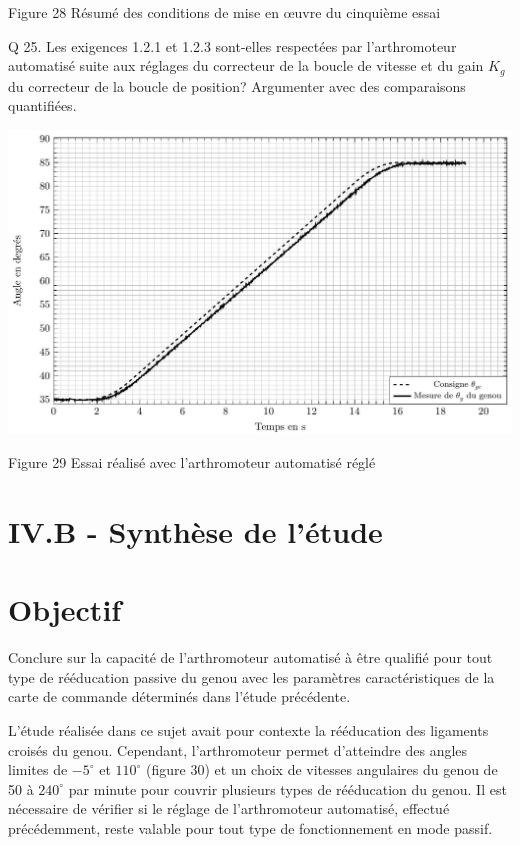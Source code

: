\documentclass[10pt]{article}
\begin{document}
Figure 28 Résumé des conditions de mise en œuvre du cinquième essai

Q 25. Les exigences 1.2.1 et 1.2.3 sont-elles respectées par l'arthromoteur automatisé suite aux réglages du correcteur de la boucle de vitesse et du gain $K_{g}$ du correcteur de la boucle de position? Argumenter avec des comparaisons quantifiées.

\begin{center}
\includegraphics[max width=\textwidth]{2024_07_14_a83aebba33898893d39fg-17}
\end{center}

Figure 29 Essai réalisé avec l'arthromoteur automatisé réglé

\section*{IV.B - Synthèse de l'étude}
\section*{Objectif}
Conclure sur la capacité de l'arthromoteur automatisé à être qualifié pour tout type de rééducation passive du genou avec les paramètres caractéristiques de la carte de commande déterminés dans l'étude précédente.

L'étude réalisée dans ce sujet avait pour contexte la rééducation des ligaments croisés du genou. Cependant, l'arthromoteur permet d'atteindre des angles limites de $-5^{\circ}$ et $110^{\circ}$ (figure 30) et un choix de vitesses angulaires du genou de 50 à $240^{\circ}$ par minute pour couvrir plusieurs types de rééducation du genou. Il est nécessaire de vérifier si le réglage de l'arthromoteur automatisé, effectué précédemment, reste valable pour tout type de fonctionnement en mode passif.
\end{document}
